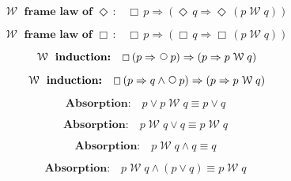 \documentclass[12pt, fleqn, leqno]{article}
\newcommand{\impl}{\ensuremath{\Rightarrow}}        %
\newcommand{\Wait}{\;\mathcal{W}\;}
\newcommand{\Next}{\;\,\text{\raisebox{3.5pt}{\circle{6}}}}
\newcommand{\Event}{\Diamond\,}
\newcommand{\Always}{\Box\,}
\newcommand{\spacer}{\vspace{-30pt}}
\begin{document}
\spacer

\begin{equation}\label{E:waitframelawEvent}
\textbf{$\Wait$ frame law of $\Event$:}\quad \Always p \impl (\Event q \impl \Event (p \Wait q))
\end{equation}

\spacer

\begin{equation}\label{E:waitframelawAlways}
\textbf{$\Wait$ frame law of $\Always$:}\quad \Always p \impl (\Always q \impl \Always (p \Wait q))
\end{equation}

\spacer

\begin{equation}\label{E:waitInduct1}
\textbf{$\Wait$ induction:}\quad \Always (p \impl \Next p) \impl  (p \impl p \Wait q)
\end{equation}

\spacer

\begin{equation}\label{E:waitInduct2}
\textbf{$\Wait$ induction:}\quad \Always (p \impl q \land \Next p) \impl  (p \impl p \Wait q)
\end{equation}

\spacer


\begin{equation}\label{E:waitOrP}
\textbf{Absorption:}\quad p\lor p\Wait q\equiv p\lor q
\end{equation}

\spacer

\begin{equation}\label{E:waitOrQ}
\textbf{Absorption:}\quad p\Wait q\lor q\equiv p\Wait q
\end{equation}

\spacer

\begin{equation}\label{E:waitAndQ}
\textbf{Absorption:}\quad p\Wait q\land q\equiv q
\end{equation}

\spacer

\begin{equation}\label{E:waitAndOr}
\textbf{Absorption:}\quad p\Wait q\land (p\lor q) \equiv p\Wait q
\end{equation}
\end{document}
